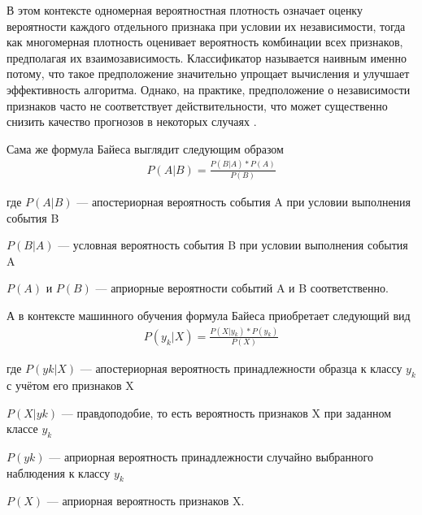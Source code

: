 В этом контексте одномерная вероятностная плотность означает оценку вероятности каждого отдельного признака при условии их независимости, тогда как многомерная плотность оценивает вероятность комбинации всех признаков, предполагая их взаимозависимость. Классификатор называется наивным именно потому, что такое предположение значительно упрощает вычисления и улучшает эффективность алгоритма. Однако, на практике, предположение о независимости признаков часто не соответствует действительности, что может существенно снизить качество прогнозов в некоторых случаях .

Сама же формула Байеса выглядит следующим образом
\begin{gather}
    P(A|B) = \frac{P(B|A) * P(A)}{P(B)}
\end{gather}

где $P(A|B)$ — апостериорная вероятность события A при условии выполнения события B

$P(B|A)$ — условная вероятность события B при условии выполнения события A

$P(A)$ и $P(B)$ — априорные вероятности событий A и B соответственно.


А в контексте машинного обучения формула Байеса приобретает следующий вид
\begin{gather}
    P(y_k|X) = \frac{P(X|y_k) * P(y_k)}{P(X)}
\end{gather}

где $P(yk|X)$ — апостериорная вероятность принадлежности образца к классу $y_k$ с учётом его признаков X

$P(X|yk)$ — правдоподобие, то есть вероятность признаков X при заданном классе $y_k$

$P(yk)$ — априорная вероятность принадлежности случайно выбранного наблюдения к классу $y_k$

$P(X)$ — априорная вероятность признаков X.



